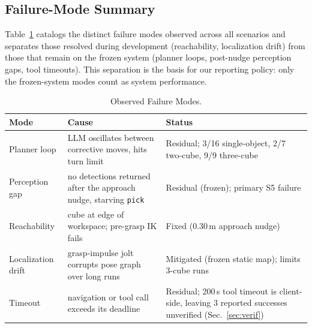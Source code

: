 \documentclass[conference]{IEEEtran}
\begin{document}
\subsection{Failure-Mode Summary}

Table~\ref{tab:failures} catalogs the distinct failure modes observed across
all scenarios and separates those resolved during development
(reachability, localization drift) from those that remain on the frozen
system (planner loops, post-nudge perception gaps, tool timeouts). This
separation is the basis for our reporting policy: only the frozen-system
modes count as system performance.

\begin{table}[t]
\caption{Observed Failure Modes.}
\label{tab:failures}
\centering
\small
\begin{tabular}{@{}p{2.2cm}p{2.6cm}p{2.6cm}@{}}
\toprule
\textbf{Mode} & \textbf{Cause} & \textbf{Status} \\
\midrule
Planner loop & LLM oscillates between corrective moves, hits turn limit & Residual; 3/16 single-object, 2/7 two-cube, 9/9 three-cube \\
Perception gap & no detections returned after the approach nudge, starving \texttt{pick} & Residual (frozen); primary S5 failure \\
Reachability & cube at edge of workspace; pre-grasp IK fails & Fixed (0.30\,m approach nudge) \\
Localization drift & grasp-impulse jolt corrupts pose graph over long runs & Mitigated (frozen static map); limits 3-cube runs \\
Timeout & navigation or tool call exceeds its deadline & Residual; 200\,s tool timeout is client-side, leaving 3 reported successes unverified (Sec.~\ref{sec:verif}) \\
\bottomrule
\end{tabular}
\end{table}
\end{document}
